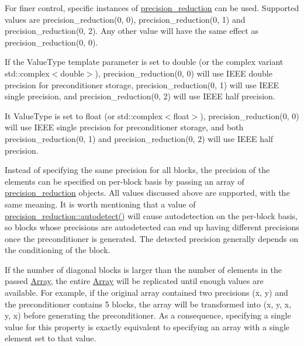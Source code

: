 For finer control, specific instances of \hyperlink{classgko_1_1precision__reduction}{precision\+\_\+reduction} can be used. Supported values are {\ttfamily precision\+\_\+reduction(0, 0)}, {\ttfamily precision\+\_\+reduction(0, 1)} and {\ttfamily precision\+\_\+reduction(0, 2)}. Any other value will have the same effect as {\ttfamily precision\+\_\+reduction(0, 0)}.

If the Value\+Type template parameter is set to {\ttfamily double} (or the complex variant {\ttfamily std\+::complex$<$double$>$}), {\ttfamily precision\+\_\+reduction(0, 0)} will use I\+E\+EE double precision for preconditioner storage, {\ttfamily precision\+\_\+reduction(0, 1)} will use I\+E\+EE single precision, and {\ttfamily precision\+\_\+reduction(0, 2)} will use I\+E\+EE half precision.

It Value\+Type is set to {\ttfamily float} (or {\ttfamily std\+::complex$<$float$>$}), {\ttfamily precision\+\_\+reduction(0, 0)} will use I\+E\+EE single precision for preconditioner storage, and both {\ttfamily precision\+\_\+reduction(0, 1)} and {\ttfamily precision\+\_\+reduction(0, 2)} will use I\+E\+EE half precision.

Instead of specifying the same precision for all blocks, the precision of the elements can be specified on per-\/block basis by passing an array of \hyperlink{classgko_1_1precision__reduction}{precision\+\_\+reduction} objects. All values discussed above are supported, with the same meaning. It is worth mentioning that a value of {\ttfamily \hyperlink{classgko_1_1precision__reduction_ac4109c61fadb24db7a1888c51ac483e9}{precision\+\_\+reduction\+::autodetect()}} will cause autodetection on the per-\/block basis, so blocks whose precisions are autodetected can end up having different precisions once the preconditioner is generated. The detected precision generally depends on the conditioning of the block.

If the number of diagonal blocks is larger than the number of elements in the passed \hyperlink{classgko_1_1Array}{Array}, the entire \hyperlink{classgko_1_1Array}{Array} will be replicated until enough values are available. For example, if the original array contained two precisions {\ttfamily (x, y)} and the preconditioner contains 5 blocks, the array will be transformed into {\ttfamily (x, y, x, y, x)} before generating the preconditioner. As a consequence, specifying a single value for this property is exactly equivalent to specifying an array with a single element set to that value.

